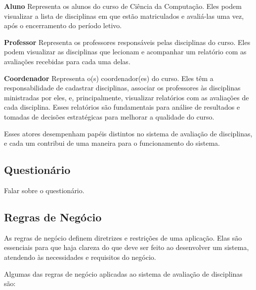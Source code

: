 \begin{alineas}
  \item \textbf{Aluno} Representa os alunos do curso de Ciência da Computação. Eles podem visualizar a lista de disciplinas em que estão matriculados e avaliá-las uma vez, após o encerramento do período letivo.
  \item \textbf{Professor} Representa os professores responsáveis pelas disciplinas do curso. Eles podem visualizar as disciplinas que lecionam e acompanhar um relatório com as avaliações recebidas para cada uma delas.
  \item \textbf{Coordenador} Representa o(s) coordenador(es) do curso. Eles têm a responsabilidade de cadastrar disciplinas, associar os professores às disciplinas ministradas por eles, e, principalmente, visualizar relatórios com as avaliações de cada disciplina. Esses relatórios são fundamentais para análise de resultados e tomadas de decisões estratégicas para melhorar a qualidade do curso.
\end{alineas}

Esses atores desempenham papéis distintos no sistema de avaliação de disciplinas, e cada um contribui de uma maneira para o funcionamento do sistema.

\subsection{Questionário}

Falar sobre o questionário.

\subsection{Regras de Negócio}
As regras de negócio definem diretrizes e restrições de uma aplicação. Elas são essenciais para que haja clareza do que deve ser feito ao desenvolver um sistema, atendendo às necessidades e requisitos do negócio.

Algumas das regras de negócio aplicadas ao sistema de avaliação de disciplinas são:


